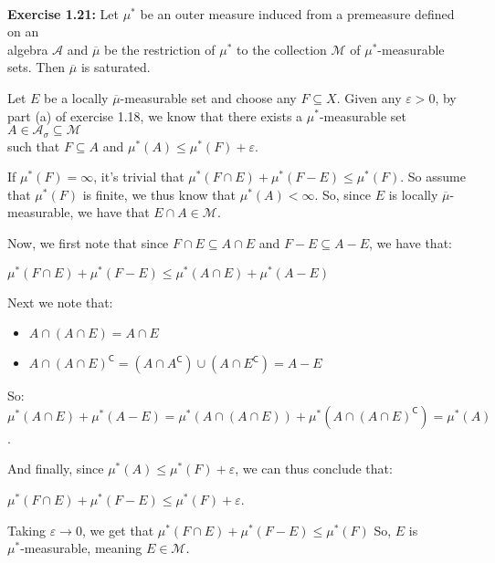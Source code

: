 \documentclass{book}
\newcommand{\exTwoP}{%
   \color{RedViolet}%
   \fontsize{13}{15}\selectfont%
}
\newenvironment{myIndent}{%
   \begin{adjustwidth}{2.5em}{0em}%
}{%
   \end{adjustwidth}%
}
\newcommand{\blab}[1]{\textbf{#1}}
\newcommand{\comp}{\mathsf{C}}
\newcommand{\mySepTwo}[1][.]{%
   {\noindent\color{#1}{\rule{6.5in}{0.5mm}}}\\%
}
\newcommand{\retTwo}{\hfill\bigbreak}
\begin{document}
\mySepTwo

\blab{Exercise 1.21:} Let $\mu^*$ be an outer measure induced from a premeasure defined on an\\ algebra $\mathcal{A}$ and $\overline{\mu}$ be the restriction of $\mu^*$ to the collection $\mathcal{M}$ of $\mu^*$-measurable sets. Then $\overline{\mu}$ is saturated.\\ [-9pt]


\begin{myIndent}\exTwoP
   Let $E$ be a locally $\overline{\mu}$-measurable set and choose any $F \subseteq X$. Given any $\varepsilon > 0$, by part (a) of exercise 1.18, we know that there exists a $\mu^*$-measurable set $A \in \mathcal{A}_{\sigma} \subseteq \mathcal{M}$\\ such that $F \subseteq A$ and $\mu^*(A) \leq \mu^*(F) + \varepsilon$.\retTwo

   If $\mu^*(F) = \infty$, it's trivial that $\mu^*(F \cap E) + \mu^*(F - E) \leq \mu^*(F)$. So assume  that $\mu^*(F)$ is finite, we thus know that $\mu^*(A) < \infty$. So, since $E$ is locally $\overline{\mu}$-measurable, we have that $E \cap A \in \mathcal{M}$.\retTwo

   Now, we first note that since $F \cap E \subseteq A \cap E$ and $F - E \subseteq A - E$, we have that:

   {\centering $\mu^*(F \cap E) + \mu^*(F - E) \leq \mu^*(A \cap E) + \mu^*(A - E) $\retTwo\par}

   Next we note that: 
   \begin{itemize}
      \item $A \cap (A \cap E) = A \cap E$
      \item $A \cap (A \cap E)^\comp = (A \cap A^\comp) \cup (A \cap E^\comp) = A - E$\retTwo
   \end{itemize}

   So: $\mu^*(A \cap E) + \mu^*(A - E) = \mu^*(A \cap (A \cap E)) + \mu^*(A \cap (A \cap E)^\comp) = \mu^*(A)$.\retTwo

   And finally, since $\mu^*(A) \leq \mu^*(F) + \varepsilon$, we can thus conclude that:
   
   {\centering$\mu^*(F \cap E) + \mu^*(F - E) \leq \mu^*(F) + \varepsilon$.\retTwo\par}

   Taking $\varepsilon \rightarrow 0$, we get that $\mu^*(F \cap E) + \mu^*(F - E) \leq \mu^*(F)$ So, $E$ is\\ $\mu^*$-measurable, meaning $E \in \mathcal{M}$.\newpage
\end{myIndent}
\end{document}
